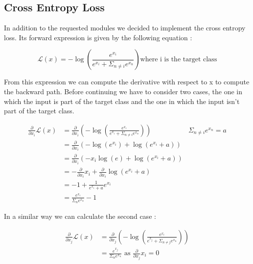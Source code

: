 \documentclass{article}
\begin{document}
\subsection{Cross Entropy Loss}

In addition to the requested modules we decided to implement the cross entropy loss. Its forward expression is given by the following equation : 

\begin{equation}
\mathcal{L}(x) = - \log \left( \frac{e^{x_i}}{e^{x_i} + \Sigma_{n \ne i} e^{x_n}} \right) \text{where i is the target class} 
\end{equation}

From this expression we can compute the derivative with respect to x to compute the backward path. 
Before continuing we have to consider two cases, the one in which the input is part of the target class and the one in which the input isn't part of the target class.

\begin{equation}
\begin{array}{ll|l}
\frac{\partial}{\partial x_i} \mathcal{L}(x) & = \frac{\partial}{\partial x_i} \left( - \log \left( \frac{e^{x_i}}{e^{x_i} + \Sigma_{n \ne i} e^{x_n}} \right)\right) & \Sigma_{n \ne i} e^{x_n} = a\\
 & = \frac{\partial}{\partial x_i} \left( -\log(e^{x_i}) + \log(e^{x_i} + a) \right) & \\
 & = \frac{\partial}{\partial x_i} \left(-x_i\log(e) + \log(e^{x_i} + a) \right) &  \\
 & = - \frac{\partial}{\partial x_i} x_i + \frac{\partial}{\partial x_i}\log(e^{x_i} + a) & \\
 & = -1 + \frac{1}{e^{x_i} + a}e^{x_i} & \\
 & =  \frac{e^{x_i}}{\Sigma_{n} e^{x_n}} - 1 & 
\end{array}
\end{equation}

In a similar way we can calculate the second case : 

\begin{equation}
\begin{split}
\frac{\partial}{\partial x_j} \mathcal{L}(x) & = \frac{\partial}{\partial x_j} \left( - \log \left( \frac{e^{x_i}}{e^{x_j} + \Sigma_{n \ne j} e^{x_n}} \right)\right) \\
 & = \frac{e^{x_j}}{\Sigma_{n} e^{x_n}} \text{ as } \frac{\partial}{\partial x_j} x_i = 0
\end{split}
\end{equation}
\end{document}
